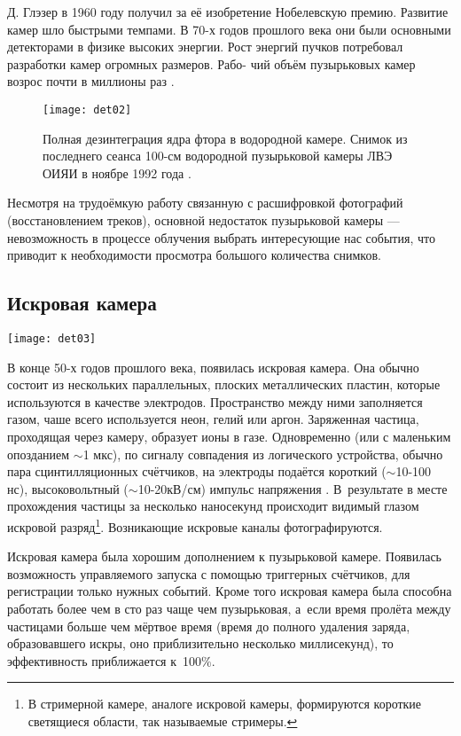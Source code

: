 Д. Глэзер в 1960 году получил за её изобретение Нобелевскую премию.
Развитие камер шло быстрыми темпами. В 70-х годов прошлого века они были
основными детекторами в физике высоких энергии. Рост энергий пучков
потребовал разработки камер огромных размеров.
Рабо- \newpage \noindent чий объём пузырьковых камер возрос почти
в миллионы раз \cite{har}.
\begin{figure}[h]\center
  \texttt{[image: det02]}
  \caption{Полная дезинтеграция ядра фтора в водородной камере. Снимок из
    последнего сеанса 100-см водородной пузырьковой камеры ЛВЭ ОИЯИ
    в ноябре 1992 года \cite{gla}.}
\end{figure}

Несмотря на трудоёмкую работу связанную с расшифровкой фотографий
(восстановлением треков), основной недостаток пузырьковой
каме\-ры --- невозможность в процессе облучения выбрать интересующие нас
события, что приводит к необходимости просмотра большого количества
снимков.

\subsection{Искровая камера}
\begin{floatingfigure}[r]{0.20\textwidth}
  \vspace{-0.5cm}
  \hspace{-0.6cm}
  \texttt{[image: det03]}
\end{floatingfigure}
В конце 50-х годов прошлого века, появилась искровая камера. Она обычно
состоит из нескольких параллельных, плоских металлических пластин, которые
используются в качестве электродов. Пространство между ними заполняется
газом, чаше всего используется неон, гелий или аргон. Заряженная частица,
проходящая через камеру, образует ионы в газе. Одновременно (или
с маленьким опозданием $\sim$1 мкс), по сигналу совпадения из логического
устройства, обычно пара сцинтилляционных счётчиков, на электроды подаётся
короткий ($\sim$10-100 нс), высоковольтный ($\sim$10-20кВ/см) импульс
напряжения \cite{duk:04}. В~результате в месте прохождения частицы за
несколько наносекунд происходит видимый глазом искровой разряд\footnote{
  В стримерной камере, аналоге искровой камеры, формируются короткие
  светящиеся области, так называемые стримеры.}.
Возникающие искровые каналы фотографируются.

Искровая камера была хорошим дополнением к пузырьковой камере.
Появилась возможность управляемого запуска с помощью триггерных
счётчиков, для регистрации только нужных событий. Кроме того искровая
камера была способна работать более чем в сто раз чаще чем пузырьковая,
а~если время пролёта между частицами больше чем мёртвое время (время до
полного удаления заряда, образовавшего искры, оно приблизительно
несколько миллисекунд), то эффективность приближается к~100$\%$.

